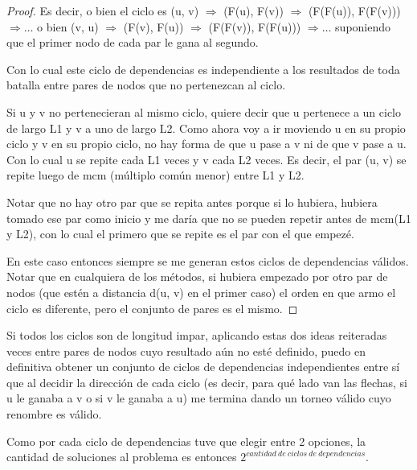 \begin{proof}
	Es decir, o bien el ciclo es (u, v) $\Rightarrow$ (F(u), F(v)) $\Rightarrow$ (F(F(u)), F(F(v))) $\Rightarrow \ldots$ o bien (v, u) $\Rightarrow$ (F(v), F(u)) $\Rightarrow$ (F(F(v)), F(F(u))) $\Rightarrow \ldots$ suponiendo que el primer nodo de cada par le gana al segundo. \newline

	Con lo cual este ciclo de dependencias es independiente a los resultados de toda batalla entre pares de nodos que no pertenezcan al ciclo. \newline 

	Si u y v no pertenecieran al mismo ciclo, quiere decir que u pertenece a un ciclo de largo L1 y v a uno de largo L2. Como ahora voy a ir moviendo u en su propio ciclo y v en su propio ciclo, no hay forma de que u pase a v ni de que v pase a u. Con lo cual u se repite cada L1 veces y v cada L2 veces. Es decir, el par (u, v) se repite luego de mcm (múltiplo común menor) entre L1 y L2. \newline

	Notar que no hay otro par que se repita antes porque si lo hubiera, hubiera tomado ese par como inicio y me daría que no se pueden repetir antes de mcm(L1 y L2), con lo cual el primero que se repite es el par con el que empezé. \newline

	En este caso entonces siempre se me generan estos ciclos de dependencias válidos. Notar que en cualquiera de los métodos, si hubiera empezado por otro par de nodos (que estén a distancia d(u, v) en el primer caso) el orden en que armo el ciclo es diferente, pero el conjunto de pares es el mismo.

\end{proof}

\begin{corollary}
	Si todos los ciclos son de longitud impar, aplicando estas dos ideas reiteradas veces entre pares de nodos cuyo resultado aún no esté definido, puedo en definitiva obtener un conjunto de ciclos de dependencias independientes entre sí que al decidir la dirección de cada ciclo (es decir, para qué lado van las flechas, si u le ganaba a v o si v le ganaba a u) me termina dando un torneo válido cuyo renombre es válido. \newline

	Como por cada ciclo de dependencias tuve que elegir entre 2 opciones, la cantidad de soluciones al problema es entonces $2^{cantidad\ de\ ciclos\ de\ dependencias}$.
\end{corollary}


